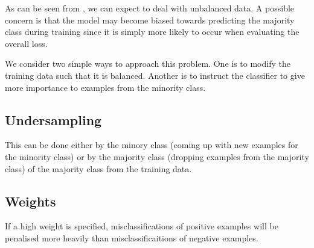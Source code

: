 \documentclass[
	fontsize=10pt, %
	twoside=false, %
	secnumdepth=1, %
]{kaobook}
\begin{document}




As can be seen from , we can expect to deal with unbalanced
data. 
A possible concern is that the model may become biased towards predicting
the majority class during training since it is simply more likely to occur when
evaluating the overall loss.

We consider two simple ways to approach this problem. One is to modify the
training data such that it is balanced. Another is to instruct the classifier to
give more importance to examples from the minority class.



\subsection{Undersampling}
This can be done either by
 the minory class (coming up with new examples for the
minority class) or by  the majority class (dropping examples
from the majority class) of the majority class from the training data.
%






\subsection{Weights} 
If a high weight is specified, misclassifications of positive
examples will be penalised more heavily than misclassificaitions of negative examples.
\end{document}
